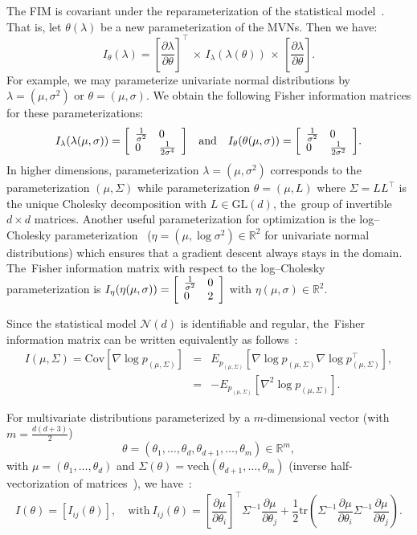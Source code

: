 \documentclass[entropy,article,accept,oneauthor,pdftex,entropy]{Definitions/mdpi}
\def\GL{\mathrm{GL}}
\def\bbR{\mathbb{R}}
\def\mattwotwo#1#2#3#4{{\left[\begin{array}{ll}#1 & #2\cr #3 & #4\end{array}\right]}}
\def\tr{\mathrm{tr}}
\def\calN{\mathcal{N}}
\def\vech{\mathrm{vech}}
\def\bbR{\mathbb{R}}
\def\Cov{\mathrm{Cov}}
\begin{document}
The FIM is covariant under the reparameterization of the statistical model~\cite{calin2014geometric}.
That is, let $\theta(\lambda)$ be a new parameterization of the MVNs. Then we have:
$$
I_\theta(\lambda)=\left[\frac{\partial\lambda}{\partial\theta}\right]^\top\,\times\, I_\lambda(\lambda(\theta)) \,\times\,
 \left[\frac{\partial\lambda}{\partial\theta}\right].
$$
For example, we may parameterize univariate normal distributions by $\lambda=(\mu,\sigma^2)$ or $\theta=(\mu,\sigma)$.
We obtain the following Fisher information matrices for these parameterizations:
$$
I_\lambda(\lambda(\mu,\sigma))=\mattwotwo{\frac{1}{\sigma^2}}{0}{0}{\frac{1}{2\sigma^4}} \quad\mbox{and}\quad
I_\theta(\theta(\mu,\sigma))=\mattwotwo{\frac{1}{\sigma^2}}{0}{0}{\frac{1}{2\sigma^2}}.
$$
In higher dimensions, parameterization $\lambda=(\mu,\sigma^2)$ corresponds to the parameterization $(\mu,\Sigma)$ 
while parameterization $\theta=(\mu,L)$ where $\Sigma=LL^\top$ is the unique Cholesky decomposition with $L\in\GL(d)$, the~group of invertible $d\times d$ matrices. Another useful parameterization for optimization is the 
log–Cholesky parameterization~\cite{lin2019riemannian} ($\eta=(\mu,\log\sigma^2)\in\bbR^2$ for univariate normal distributions) which ensures that a gradient descent always stays in the domain. The~Fisher information matrix with respect to the log–Cholesky parameterization is 
$I_\eta(\eta(\mu,\sigma))=\mattwotwo{\frac{1}{\sigma^2}}{0}{0}{2}$ with $\eta(\mu,\sigma)\in\bbR^2$.


Since the statistical model $\calN(d)$ is identifiable and regular, the~Fisher information matrix can be written equivalently as follows~\cite{calin2014geometric,soen2021variance}:
\begin{eqnarray}
I(\mu,\Sigma)=\Cov[\nabla\log p_{(\mu,\Sigma)}] &=& E_{p_{(\mu,\Sigma)}}\left[\nabla\log p_{(\mu,\Sigma)}\nabla\log p_{(\mu,\Sigma)}^\top\right],\\
&=&-E_{p_{(\mu,\Sigma)}}\left[\nabla^2\log p_{(\mu,\Sigma)}\right]. \label{eq:FIM2}
\end{eqnarray}

For multivariate distributions parameterized by a $m$-dimensional vector (with $m=\frac{d(d+3)}{2}$)
$$
\theta=(\theta_1,\ldots,\theta_d,\theta_{d+1},\ldots,\theta_{m})\in\bbR^m,
$$
with $\mu=(\theta_1,\ldots,\theta_d)$ and $\Sigma(\theta)=\vech(\theta_{d+1},\ldots,\theta_{m})$ (inverse half-vectorization of matrices~\cite{barachant2013classification}), we have~\cite{Skovgaard-1981,Skovgaard-1984,malago2015information,herntier2022transversality}:
$$
I(\theta)=[I_{ij}(\theta)],\quad \mbox{with}\ 
I_{ij}(\theta)=
\left[\frac{\partial\mu}{\partial\theta_i}\right]^\top\Sigma^{-1}\frac{\partial\mu}{\partial\theta_j}
+\frac{1}{2}\tr\left(\Sigma^{-1}\frac{\partial\mu}{\partial\theta_i}\Sigma^{-1}\frac{\partial\mu}{\partial\theta_j} \right).
$$
\end{document}
